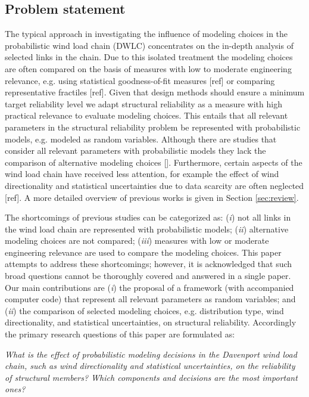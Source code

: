 \documentclass[fleqn]{article}
\begin{document}
\subsection{Problem statement}

The typical approach in investigating the influence of modeling choices in the probabilistic wind load chain (DWLC) concentrates on the in-depth analysis of selected links in the chain. Due to this isolated treatment the modeling choices are often compared on the basis of measures with low to moderate engineering relevance, e.g. using statistical goodness-of-fit measures [ref] or comparing representative fractiles [ref]. Given that design methods should ensure a minimum target reliability level we adapt structural reliability as a measure with high practical relevance to evaluate modeling choices. This entails that all relevant parameters in the structural reliability problem be represented with probabilistic models, e.g. modeled as random variables. Although there are studies that consider all relevant parameters with probabilistic models they lack the comparison of alternative modeling choices []. Furthermore, certain aspects of the wind load chain have received less attention, for example the effect of wind directionality and statistical uncertainties due to data scarcity are often neglected [ref]. A more detailed overview of previous works is given in Section \ref{sec:review}.

The shortcomings of previous studies can be categorized as: (\textit{i}) not all links in the wind load chain are represented with probabilistic models; (\textit{ii}) alternative modeling choices are not compared; (\textit{iii}) measures with low or moderate engineering relevance are used to compare the modeling choices.
This paper attempts to address these shortcomings; however, it is acknowledged that such broad questions cannot be thoroughly covered and answered in a single paper. Our main contributions are (\textit{i}) the proposal of a framework (with accompanied computer code) that represent all relevant parameters as random variables; and (\textit{ii}) the comparison of selected modeling choices, e.g. distribution type, wind directionality, and statistical uncertainties, on structural reliability. Accordingly the primary research questions of this paper are formulated as:

\textit{What is the effect of probabilistic modeling decisions in the Davenport wind load chain, such as wind directionality and statistical uncertainties, on the reliability of structural members? Which components and decisions are the most important ones?}
\end{document}
